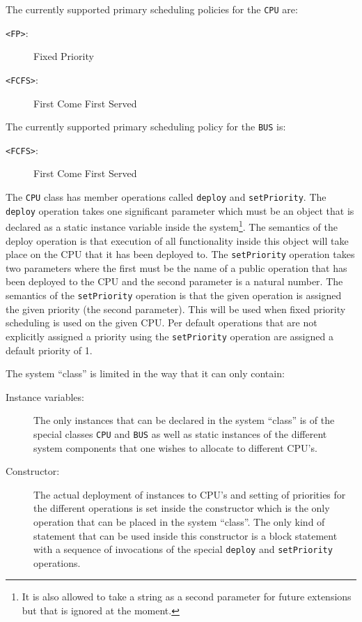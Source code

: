 \documentclass{overturerepchap}
\begin{document}
{\begin{description}
The currently supported primary scheduling policies for the \texttt{CPU}
are:
\begin{description}
\item[\texttt{<FP>}:] Fixed Priority
\item[\texttt{<FCFS>}:] First Come First Served
\end{description}

The currently supported primary scheduling policy for the \texttt{BUS}
is:
\begin{description}
\item[\texttt{<FCFS>}:] First Come First Served
\end{description}

The \texttt{CPU} class has member operations called \texttt{deploy} and
\texttt{setPriority}. The \texttt{deploy} operation takes one
significant parameter
which must be an object that is declared as a static instance variable
inside the system\footnote{It is also allowed to take a string as a
second parameter for future extensions but that is ignored at the
moment.}. The semantics of the deploy operation is that execution
of all functionality inside this object will take place on the CPU that it
has been deployed to. The \texttt{setPriority} operation takes two
parameters where the first must be the name of a public operation that
has been deployed to the CPU and the second parameter is a natural number.
The semantics of the \texttt{setPriority} operation is that the given
operation is assigned the given priority (the second parameter). This will
be used when fixed priority scheduling is used on the given CPU. Per
default operations that are not explicitly assigned a priority using
the \texttt{setPriority} operation are assigned a default priority of 1.

The system ``class'' is limited in the way that it can only contain:
\begin{description}
\item[Instance variables:] The only instances that can be declared in the 
system ``class'' is of the special classes \texttt{CPU} and \texttt{BUS} 
as well as static instances of the different system components that one
wishes to allocate to different CPU's.
\item[Constructor:] The actual deployment of instances to CPU's and setting
of priorities for the different operations is set inside the
constructor which is the only operation that can be placed in the
system ``class''. The only kind of statement that can be used inside
this constructor is a block statement with a sequence of invocations
of the special \texttt{deploy} and \texttt{setPriority} operations.
\end{description}


\end{description}}
\end{document}
